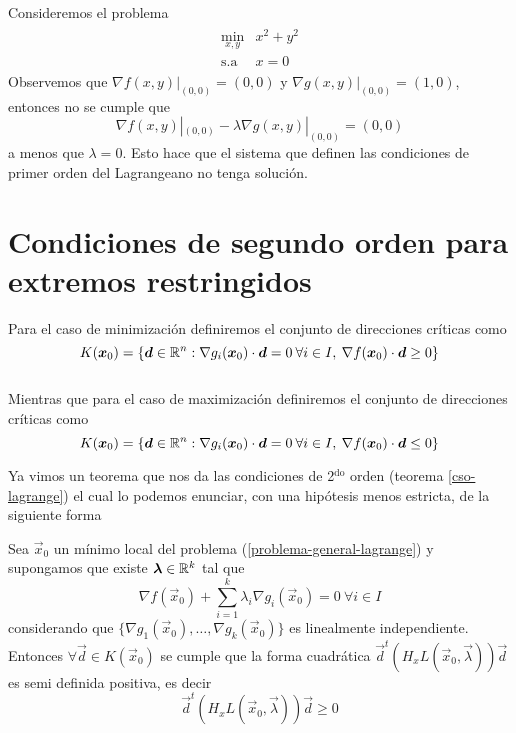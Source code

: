\begin{ejemplo} Consideremos el problema
\begin{eqnarray*}
\begin{array}{cc}
\displaystyle \min_{x,y} & x^2+y^2  \\
\text{s.a}  & x=0 
\end{array}
\end{eqnarray*}
Observemos que $\nabla f(x,y)|_{(0,0)}= (0,0)$ y $\nabla g(x,y)|_{(0,0)}=(1,0)$, entonces no se cumple que 
$$\nabla f(x,y)|_{(0,0)} - \lambda \nabla g(x,y)|_{(0,0)}=(0,0)$$ 
a menos que $\lambda = 0$. Esto hace que el sistema que definen las condiciones de primer orden del Lagrangeano no tenga soluci\'on.
\end{ejemplo}

\section{Condiciones de segundo orden para extremos restringidos}\label{seccion-cso-lagrange}

\begin{definicion}
Para el caso de minimizaci\'on definiremos el conjunto de direcciones cr\'iticas como
$$K(\boldsymbol{x}_0)=\{\boldsymbol{d}\in \mathbb{R}^n : \nabla g_i(\boldsymbol{x}_0)\cdot \boldsymbol{d} = 0 \: \forall i\in I ,\: \nabla f(\boldsymbol{x}_0)\cdot \boldsymbol{d} \geq 0\}$$
\\Mientras que para el caso de maximizaci\'on definiremos el conjunto de direcciones cr\'iticas como
$$K(\boldsymbol{x}_0)=\{\boldsymbol{d}\in \mathbb{R}^n : \nabla g_i(\boldsymbol{x}_0) \cdot \boldsymbol{d} = 0 \: \forall i\in I,\: \nabla f(\boldsymbol{x}_0)\cdot \boldsymbol{d} \leq 0\}$$
\end{definicion}

Ya vimos un teorema que nos da las condiciones de 2$^\text{do}$ orden (teorema \ref{cso-lagrange}) el cual lo podemos enunciar, con una hip\'otesis menos estricta, de la siguiente forma

\begin{teorema}\label{cso-lagrange2}
Sea $\vec{x}_0$ un m\'inimo local del problema (\ref{problema-general-lagrange}) y supongamos que existe $\boldsymbol{\lambda} \in \mathbb{R}^k$ tal que
$$\nabla f(\vec{x}_0) + \sum_{i=1}^k \lambda_i \nabla g_i(\vec{x}_0)=0 \: \forall i\in I$$
considerando que $\{\nabla g_1(\vec{x}_0),\ldots ,\nabla g_k(\vec{x}_0) \}$ es linealmente independiente. Entonces $\forall \vec{d}\in K(\vec{x}_0)$ se cumple que la forma cuadr\'atica $\vec{d}^t (H_x L(\vec{x}_0,\vec{\lambda})) \vec{d}$ es semi definida positiva, es decir
$$\vec{d}^t (H_x L(\vec{x}_0,\vec{\lambda})) \vec{d} \geq 0$$
\end{teorema}

